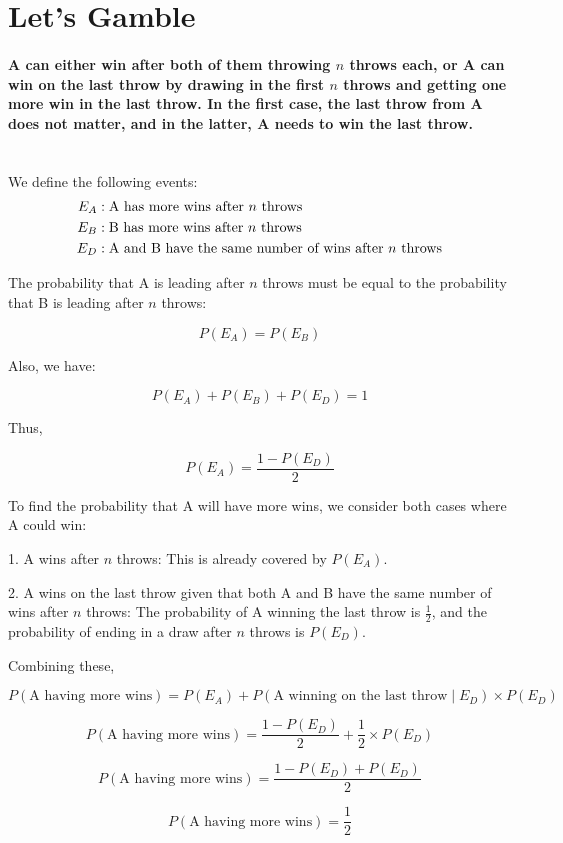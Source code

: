 \section{Let's Gamble}

\paragraph{
	A can either win after both of them throwing \( n \) throws each, or A can win on the last throw by drawing in the first \( n \) throws and getting one more win in the last throw. In the first case, the last throw from A does not matter, and in the latter, A needs to win the last throw.\\\\
}

We define the following events:
\begin{align*}
	E_A & : \text{A has more wins after \( n \) throws}                      \\
	E_B & : \text{B has more wins after \( n \) throws}                      \\
	E_D & : \text{A and B have the same number of wins after \( n \) throws}
\end{align*}

The probability that A is leading after \( n \) throws must be equal to the probability that B is leading after \( n \) throws:

\[
	P(E_A) = P(E_B)
\]

Also, we have:

\[
	P(E_A) + P(E_B) + P(E_D) = 1
\]

Thus,

\[
	P(E_A) = \frac{1 - P(E_D)}{2}
\]

To find the probability that A will have more wins, we consider both cases where A could win:

1. A wins after \( n \) throws: This is already covered by \( P(E_A) \).

2. A wins on the last throw given that both A and B have the same number of wins after \( n \) throws: The probability of A winning the last throw is \(\frac{1}{2}\), and the probability of ending in a draw after \( n \) throws is \( P(E_D) \).


Combining these,

\[
	P(\text{A having more wins}) = P(E_A) + P(\text{A winning on the last throw} \mid E_D) \times P(E_D)
\]

\[
	P(\text{A having more wins}) = \frac{1 - P(E_D)}{2} + \frac{1}{2} \times P(E_D)
\]

\[
	P(\text{A having more wins}) = \frac{1 - P(E_D) + P(E_D)}{2}
\]

\[
	P(\text{A having more wins}) = \frac{1}{2}
\]
